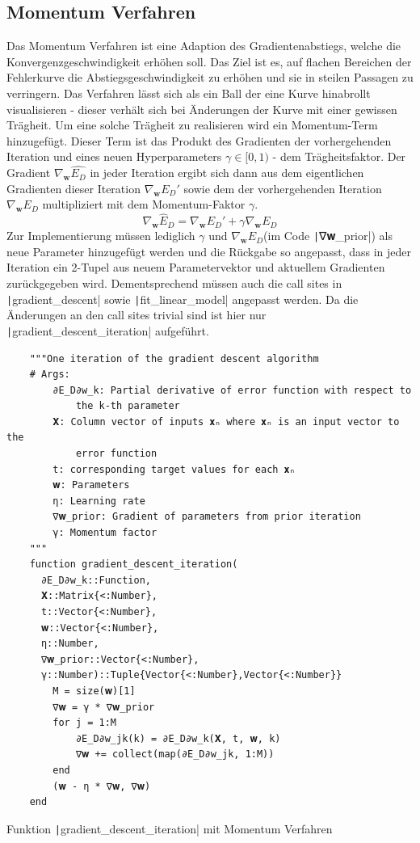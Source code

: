 \documentclass{article}
\theoremstyle{plain} %
\theoremstyle{definition} %
\begin{document}
\subsection{Momentum Verfahren}
Das Momentum Verfahren ist eine Adaption des Gradientenabstiegs, welche die Konvergenzgeschwindigkeit erhöhen soll. Das Ziel ist es, auf flachen Bereichen der Fehlerkurve die Abstiegsgeschwindigkeit zu erhöhen und sie in steilen Passagen zu verringern. Das Verfahren lässt sich als ein Ball der eine Kurve hinabrollt visualisieren - dieser verhält sich bei Änderungen der Kurve mit einer gewissen Trägheit.
Um eine solche Trägheit zu realisieren wird ein Momentum-Term hinzugefügt. Dieser Term ist das Produkt des Gradienten der vorhergehenden Iteration und eines neuen Hyperparameters $\gamma \in [0,1)$ - dem Trägheitsfaktor. Der Gradient $\nabla_\mathbf{w}\hat{E_D}$ in jeder Iteration ergibt sich dann aus dem eigentlichen Gradienten dieser Iteration $\nabla_\mathbf{w} E_D'$ sowie dem der vorhergehenden Iteration $\nabla_\mathbf{w} E_D$ multipliziert mit dem Momentum-Faktor $\gamma$.
$$
  \nabla_\mathbf{w} \hat{E}_D = \nabla_\mathbf{w} E_D' + \gamma \nabla_\mathbf{w} E_D
$$
Zur Implementierung müssen lediglich $\gamma$ und $\nabla_\mathbf{w} E_D$(im Code \texttt|∇𝐰_prior|) als neue Parameter hinzugefügt werden und die Rückgabe so angepasst, dass in jeder Iteration ein 2-Tupel aus neuem Parametervektor und aktuellem Gradienten zurückgegeben wird. Dementsprechend müssen auch die call sites in \texttt|gradient_descent| sowie \texttt|fit_linear_model| angepasst werden. Da die Änderungen an den call sites trivial sind ist hier nur \texttt|gradient_descent_iteration| aufgeführt.

\begin{listing}[H]
  \begin{verbatim}
    """One iteration of the gradient descent algorithm
    # Args:
        ∂E_D∂w_k: Partial derivative of error function with respect to
            the k-th parameter
        𝐗: Column vector of inputs 𝐱ₙ where 𝐱ₙ is an input vector to the
            error function
        t: corresponding target values for each 𝐱ₙ
        𝐰: Parameters
        η: Learning rate
        ∇𝐰_prior: Gradient of parameters from prior iteration
        γ: Momentum factor
    """
    function gradient_descent_iteration(
      ∂E_D∂w_k::Function,
      𝐗::Matrix{<:Number},
      t::Vector{<:Number},
      𝐰::Vector{<:Number},
      η::Number,
      ∇𝐰_prior::Vector{<:Number},
      γ::Number)::Tuple{Vector{<:Number},Vector{<:Number}}
        M = size(𝐰)[1]
        ∇𝐰 = γ * ∇𝐰_prior
        for j = 1:M
            ∂E_D∂w_jk(k) = ∂E_D∂w_k(𝐗, t, 𝐰, k)
            ∇𝐰 += collect(map(∂E_D∂w_jk, 1:M))
        end
        (𝐰 - η * ∇𝐰, ∇𝐰)
    end
  \end{verbatim}
  \caption{Funktion \texttt|gradient_descent_iteration| mit Momentum Verfahren}
  \label{listing:momentum}
\end{listing}
\end{document}

